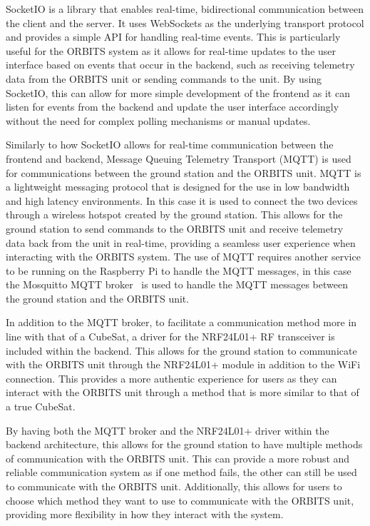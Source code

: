 \documentclass[a4paper,12pt,titlepage]{report}
\begin{document}
SocketIO is a library that enables real-time, bidirectional communication between the client and the server. It uses WebSockets as the underlying transport protocol and provides a simple API for handling real-time events. This is particularly useful for the ORBITS system as it allows for real-time updates to the user interface based on events that occur in the backend, such as receiving telemetry data from the ORBITS unit or sending commands to the unit. By using SocketIO, this can allow for more simple development of the frontend as it can listen for events from the backend and update the user interface accordingly without the need for complex polling mechanisms or manual updates.

Similarly to how SocketIO allows for real-time communication between the frontend and backend, Message Queuing Telemetry Transport (MQTT) is used for communications between the ground station and the ORBITS unit. MQTT is a lightweight messaging protocol that is designed for the use in low bandwidth and high latency environments. In this case it is used to connect the two devices through a wireless hotspot created by the ground station. This allows for the ground station to send commands to the ORBITS unit and receive telemetry data back from the unit in real-time, providing a seamless user experience when interacting with the ORBITS system. The use of MQTT requires another service to be running on the Raspberry Pi to handle the MQTT messages, in this case the Mosquitto MQTT broker~\cite{Mosquitto} is used to handle the MQTT messages between the ground station and the ORBITS unit.

In addition to the MQTT broker, to facilitate a communication method more in line with that of a CubeSat, a driver for the NRF24L01+ RF transceiver is included within the backend. This allows for the ground station to communicate with the ORBITS unit through the NRF24L01+ module in addition to the WiFi connection. This provides a more authentic experience for users as they can interact with the ORBITS unit through a method that is more similar to that of a true CubeSat.

By having both the MQTT broker and the NRF24L01+ driver within the backend architecture, this allows for the ground station to have multiple methods of communication with the ORBITS unit. This can provide a more robust and reliable communication system as if one method fails, the other can still be used to communicate with the ORBITS unit. Additionally, this allows for users to choose which method they want to use to communicate with the ORBITS unit, providing more flexibility in how they interact with the system.
\end{document}
